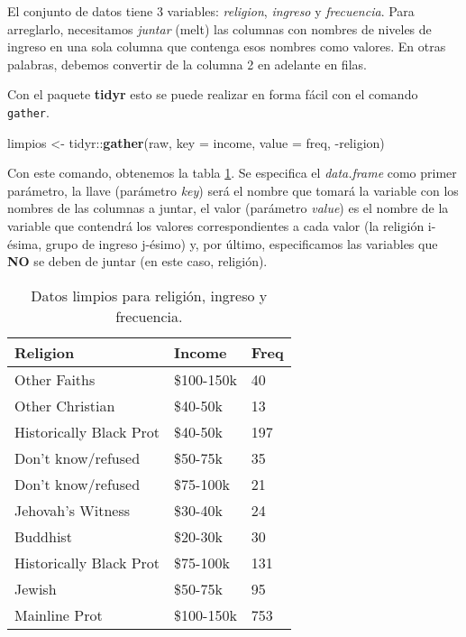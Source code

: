 \documentclass[]{article}
\newenvironment{Shaded}{\begin{snugshade}}{\end{snugshade}}
\newcommand{\KeywordTok}[1]{\textcolor[rgb]{0.13,0.29,0.53}{\textbf{{#1}}}}
\newcommand{\DataTypeTok}[1]{\textcolor[rgb]{0.13,0.29,0.53}{{#1}}}
\newcommand{\StringTok}[1]{\textcolor[rgb]{0.31,0.60,0.02}{{#1}}}
\newcommand{\NormalTok}[1]{{#1}}
\begin{document}
El conjunto de datos tiene 3 variables: \emph{religion}, \emph{ingreso}
y \emph{frecuencia}. Para arreglarlo, necesitamos \emph{juntar} (melt)
las columnas con nombres de niveles de ingreso en una sola columna que
contenga esos nombres como valores. En otras palabras, debemos convertir
de la columna 2 en adelante en filas.

Con el paquete \textbf{tidyr} esto se puede realizar en forma fácil con
el comando \texttt{gather}.

\begin{Shaded}
\begin{Highlighting}[]
\NormalTok{limpios <-}\StringTok{ }\NormalTok{tidyr::}\KeywordTok{gather}\NormalTok{(raw, }\DataTypeTok{key =} \NormalTok{income, }\DataTypeTok{value =} \NormalTok{freq, -religion)}
\end{Highlighting}
\end{Shaded}

Con este comando, obtenemos la tabla \ref{tab:ej1limpio}. Se especifica
el \emph{data.frame} como primer parámetro, la llave (parámetro
\emph{key}) será el nombre que tomará la variable con los nombres de las
columnas a juntar, el valor (parámetro \emph{value}) es el nombre de la
variable que contendrá los valores correspondientes a cada valor (la
religión i-ésima, grupo de ingreso j-ésimo) y, por último, especificamos
las variables que \textbf{NO} se deben de juntar (en este caso,
religión).

\begin{table}[ht]
\centering
\begin{tabular}{lll}
  \hline
Religion & Income & Freq \\ 
  \hline
Other Faiths & \$100-150k & 40 \\ 
  Other Christian & \$40-50k & 13 \\ 
  Historically Black Prot & \$40-50k & 197 \\ 
  Don’t know/refused & \$50-75k & 35 \\ 
  Don’t know/refused & \$75-100k & 21 \\ 
  Jehovah's Witness & \$30-40k & 24 \\ 
  Buddhist & \$20-30k & 30 \\ 
  Historically Black Prot & \$75-100k & 131 \\ 
  Jewish & \$50-75k & 95 \\ 
  Mainline Prot & \$100-150k & 753 \\ 
   \hline
\end{tabular}
\caption{Datos limpios para religión, ingreso y frecuencia.} 
\label{tab:ej1limpio}
\end{table}
\end{document}
